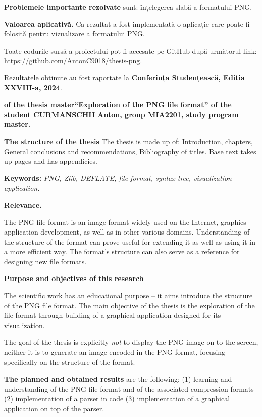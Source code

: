 \documentclass[a4paper,12pt]{report}
\newcommand{\authorName}{CURMANSCHII Anton}
\newcommand{\thesisTitleEng}{Exploration of the PNG file format}
\newcommand{\uniGroupName}{MIA2201}
\newcommand{\thesisType}{master}
\newcommand{\programulDeStudii}{master}
\renewcommand{\year}{2024}
\newcommand{\conferencesList}{Conferința Studențească, Editia XXVIII-a, \year}
\begin{document}
\textbf{Problemele importante rezolvate} sunt: înțelegerea slabă a formatului \acs{PNG}.

\textbf{Valoarea aplicativă.} Ca rezultat a fost implementată o aplicație care poate fi folosită pentru vizualizare a formatului \acs{PNG}.

Toate codurile sursă a proiectului pot fi accesate pe GitHub după următorul link: \url{https://github.com/AntonC9018/thesis-png}.

Rezultatele obținute au fost raportate la \textbf{\conferencesList}.

\clearpage
{}

\textbf{of the thesis \thesisType ``\thesisTitleEng'' of the student \authorName{}, group \uniGroupName, study program \programulDeStudii.}

\textbf{The structure of the thesis}
The thesis is made up of: Introduction,  chapters,
General conclusions and recommendations, Bibliography of \bibliographyEntryCount{} titles.
Base text takes up \usefulPageCount{} pages and has \anexeCount appendicies.

\textbf{Keywords:}
\textit{\acs{PNG}, Zlib, DEFLATE, file format, syntax tree, visualization application.}

\textbf{Relevance.}

The \acs{PNG} file format is an image format widely used on the Internet,
graphics application development, as well as in other various domains.
Understanding of the structure of the format can prove useful for extending it
as well as using it in a more efficient way.
The format's structure can also serve as a reference for designing new file formats.

\textbf{Purpose and objectives of this research}

The scientific work has an educational purpose
-- it aims introduce the structure of the \acs{PNG} file format.
The main objective of the thesis is the exploration of the file format
through building of a graphical application designed for its visualization.

The goal of the thesis is explicitly \textit{not} to display the \acs{PNG} image on to the screen,
neither it is to generate an image encoded in the \acs{PNG} format, focusing specifically
on the structure of the format.

\textbf{The planned and obtained results} are the following:
(1) learning and understanding of the \acs{PNG} file format and of the associated compression formats
(2) implementation of a parser in code
(3) implementation of a graphical application on top of the parser.
\end{document}
